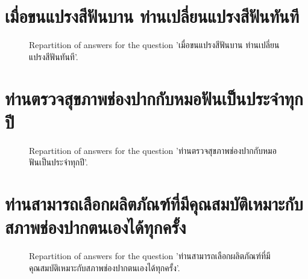 \documentclass[12pt]{article}
\begin{document}
\clearpage{}
\section{เมื่อขนแปรงสีฟันบาน ท่านเปลี่ยนแปรงสีฟันทันที}

\label{sec:78}


\begin{figure}[h!]
    \caption{\label{figure:q78-1}Repartition of answers for the question 'เมื่อขนแปรงสีฟันบาน ท่านเปลี่ยนแปรงสีฟันทันที'.}
\end{figure}



\clearpage{}
\section{ท่านตรวจสุขภาพช่องปากกับหมอฟันเป็นประจำทุกปี}

\label{sec:79}


\begin{figure}[h!]
    \caption{\label{figure:q79-1}Repartition of answers for the question 'ท่านตรวจสุขภาพช่องปากกับหมอฟันเป็นประจำทุกปี'.}
\end{figure}



\clearpage{}
\section{ท่านสามารถเลือกผลิตภัณฑ์ที่มีคุณสมบัติเหมาะกับสภาพช่องปากตนเองได้ทุกครั้ง}

\label{sec:80}


\begin{figure}[h!]
    \caption{\label{figure:q80-1}Repartition of answers for the question 'ท่านสามารถเลือกผลิตภัณฑ์ที่มีคุณสมบัติเหมาะกับสภาพช่องปากตนเองได้ทุกครั้ง'.}
\end{figure}
\end{document}
